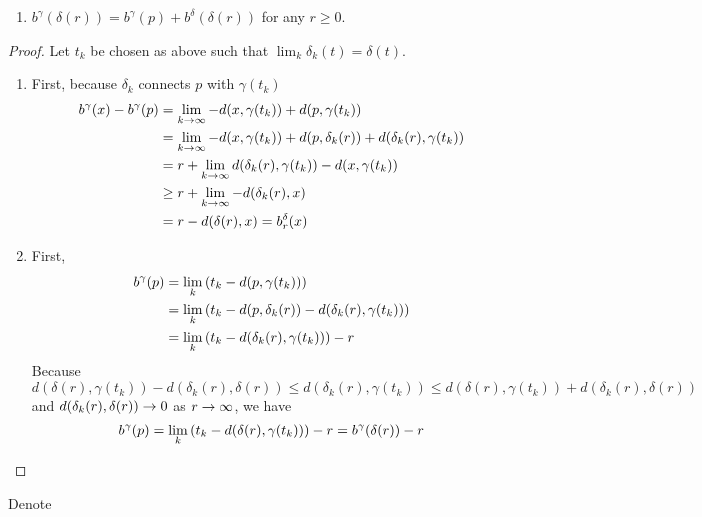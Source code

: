 \begin{enumerate}[label=\arabic{*}.]
\begin{prop}
\begin{enumerate}[label=(\arabic{*})]
			\item $b^\gamma(\delta(r)) = b^\gamma(p) + b^\delta(\delta(r))$ for any $r \geq 0$.
		\end{enumerate}
	\end{prop}
	\begin{proof}
		Let $t_k$ be chosen as above such that $\lim_k \delta_k(t) = \delta(t)$.
		\begin{enumerate}[label=(\arabic{*})]
			\item First, because $\delta_k$ connects $p$ with $\gamma(t_k)$
			\begin{equation*}
				\begin{aligned}
					b^\gamma(x) - b^\gamma(p) &= \lim_{k \rightarrow \infty} - d(x,\gamma(t_k)) + d(p,\gamma(t_k)) \\
					&= \lim_{k \rightarrow \infty} - d(x,\gamma(t_k)) + d(p,\delta_k(r)) + d(\delta_k(r),\gamma(t_k)) \\
					&= r + \lim_{k \rightarrow \infty}  d(\delta_k(r),\gamma(t_k)) - d(x,\gamma(t_k))\\
					&\geq r + \lim_{k \rightarrow \infty} -d(\delta_k(r),x) \\
					&= r - d(\delta(r),x) = b^\delta_r(x)
				\end{aligned}
			\end{equation*}
			\item First,
			\begin{equation*}
				\begin{aligned}
					b^\gamma(p) &= \lim_k \left(t_k - d(p,\gamma(t_k))\right) \\
					&= \lim_k \left(t_k - d(p,\delta_k(r)) - d(\delta_k(r),\gamma(t_k))\right) \\
					&= \lim_k \left(t_k  - d(\delta_k(r),\gamma(t_k))\right) - r  
				\end{aligned}
			\end{equation*}
			Because
			\begin{equation*}
				d(\delta(r),\gamma(t_k)) - d(\delta_k(r),\delta(r)) \leq d(\delta_k(r),\gamma(t_k)) \leq d(\delta(r),\gamma(t_k)) + d(\delta_k(r),\delta(r))
			\end{equation*}
			and $d(\delta_k(r),\delta(r)) \rightarrow 0$ as $r \rightarrow \infty$, we have
			\begin{equation*}
				b^\gamma(p) =  \lim_k \left(t_k  - d(\delta(r),\gamma(t_k))\right) - r = b^\gamma(\delta(r)) - r \qedhere
			\end{equation*}
		\end{enumerate}
	\end{proof}
	Denote
	\begin{equation*}

\end{equation*}
\end{enumerate}
